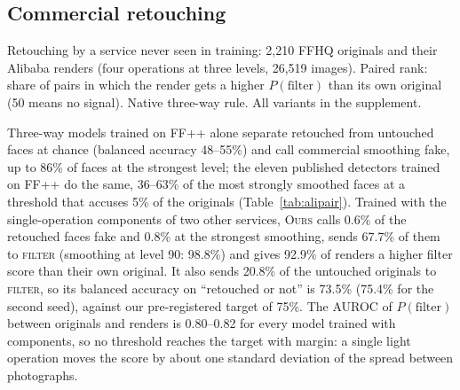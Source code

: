 \documentclass[conference]{IEEEtran}
\newcommand{\ours}{\textsc{Ours}}
\begin{document}
\subsection{Commercial retouching}
\label{sec:ali}
\begin{table}[t]
\centering
\caption{Retouching by a service never seen in training: 2,210 FFHQ originals and their Alibaba renders (four
operations at three levels, 26,519 images). Paired rank: share of pairs in which the render gets a higher
$P(\text{filter})$ than its own original (50 means no signal). Native three-way rule. All variants in the supplement.}
\label{tab:alipair}
\footnotesize
\begin{adjustbox}{max width=\textwidth}\end{adjustbox}
\end{table}
Three-way models trained on FF++ alone separate retouched from untouched faces at chance (balanced accuracy 48--55\%)
and call commercial smoothing fake, up to 86\% of faces at the strongest level; the eleven published detectors trained on
FF++ do the same, 36--63\% of the most strongly smoothed faces at a threshold that accuses 5\% of the originals
(Table~\ref{tab:alipair}). Trained with the single-operation components of two other services, \ours{} calls 0.6\% of the
retouched faces fake and 0.8\% at the strongest smoothing, sends 67.7\% of them to \textsc{filter} (smoothing at level 90:
98.8\%) and gives 92.9\% of renders a higher filter score than their own original. It also sends 20.8\% of the untouched
originals to \textsc{filter}, so its balanced accuracy on ``retouched or not'' is 73.5\% (75.4\% for the second seed),
against our pre-registered target of 75\%. The AUROC of $P(\text{filter})$ between originals and renders is 0.80--0.82
for every model trained with components, so no threshold reaches the target with margin: a single light operation moves
the score by about one standard deviation of the spread between photographs.
\end{document}
